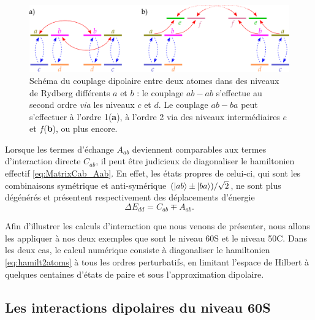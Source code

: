 \begin{figure}[!h]
\centering
\includegraphics[width=0.9\linewidth]{figures/theory/dipole_coupling_abab}
\caption[Couplage dipolaire entre niveaux de Rydberg différents]{Schéma du couplage dipolaire entre deux atomes dans des niveaux de Rydberg différents $a$ et $b$ : le couplage $ab-ab$ s'effectue au second ordre \textit{via} les niveaux $c$ et $d$. Le couplage $ab-ba$ peut s'effectuer à l'ordre 1(\textbf{a}), à l'ordre 2 via des niveaux intermédiaires $e$ et $f$(\textbf{b}), ou plus encore.}
\label{fig:Dip_abab}
\end{figure}


Lorsque les termes d'échange $A_{ab}$ deviennent comparables aux termes d'interaction directe $C_{ab}$, il peut être judicieux de diagonaliser le hamiltonien effectif \eqref{eq:MatrixCab_Aab}.
En effet, les états propres de celui-ci, qui sont les combinaisons symétrique et anti-symérique $(\ket{ab}\pm \ket{ba})/\sqrt{2}$, ne sont plus dégénérés et présentent respectivement des déplacements d'énergie
\begin{equation}
\label{eq:shift_abab}
\Delta E_{dd} = C_{ab} \mp A_{ab}.
\end{equation}

Afin d'illustrer les calculs d'interaction que nous venons de présenter, nous allons les appliquer à nos deux exemples que sont le niveau 60S et le niveau 50C.
Dans les deux cas, le calcul numérique consiste à diagonaliser le hamiltonien \eqref{eq:hamilt2atoms} à tous les ordres perturbatifs, en limitant l'espace de Hilbert à quelques centaines d'états de paire et sous l'approximation dipolaire.

\subsection{Les interactions dipolaires du niveau 60S}

